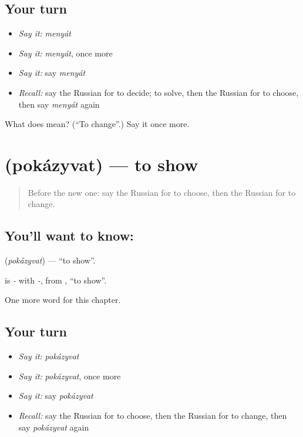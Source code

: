\subsection*{Your turn}
\begin{itemize}
\raggedright
  \item \emph{Say it:} \emph{menyát}
  \item \emph{Say it:} \emph{menyát}, once more
  \item \emph{Say it:} say \emph{menyát}
  \item \emph{Recall:} say the Russian for to decide; to solve, then the Russian for to choose, then say \emph{menyát} again
\end{itemize}

\begin{tcolorbox}[breakable,colback=teal!4,colframe=teal!35!black,title={Before you move on}]
What does  mean? (\textquotedblleft{}To change\textquotedblright{}.) Say it once more.
\end{tcolorbox}
\section[\texorpdfstring{\ru{показывать} (pokázyvat)}{показывать (pokázyvat)}]{ (pokázyvat) — to show}

\label{lesson:RU-C233-pokazyvat}



\begin{quote}
Before the new one: say the Russian for to choose, then the Russian for to change.
\end{quote}

\subsection*{You'll want to know: }
\textbf{} (\emph{pokázyvat}) — \textquotedblleft{}to show\textquotedblright{}.

\begin{cousinweb}
\textbf{} is \emph{-} with \emph{-}, from \emph{}, \textquotedblleft{}to show\textquotedblright{}.
\end{cousinweb}

\begin{grammarlens}[title={What you've built}]
One more word for this chapter.
\end{grammarlens}

\subsection*{Your turn}
\begin{itemize}
\raggedright
  \item \emph{Say it:} \emph{pokázyvat}
  \item \emph{Say it:} \emph{pokázyvat}, once more
  \item \emph{Say it:} say \emph{pokázyvat}
  \item \emph{Recall:} say the Russian for to choose, then the Russian for to change, then say \emph{pokázyvat} again
\end{itemize}

